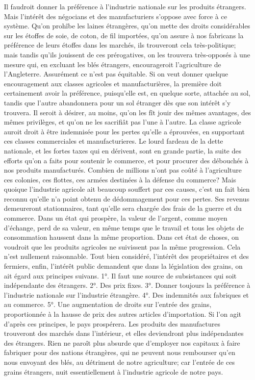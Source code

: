 \setcounter{page}{333} Il faudroit donner la préférence à l'industrie nationale sur les produits étrangers. Mais l'intérêt des négocians et des manufacturiers s'oppose avec force à ce système. Qu'on prohîbe les laines étrangères, qu'on mette des droits considérables sur les étoffes de soie, de coton, de fil importées, qu'on assure à nos fabricans la préférence de leurs étoffes dans les marchés, ils trouveront cela très-politique; mais tandis qu'ils jouissent de ces prérogatives, on les trouvera très-opposés à une mesure qui, en excluant les blés étrangers, encourageroit l'agriculture de l'Angleterre. Assurément ce n'est pas équitable. Si on veut donner quelque encouragement aux classes agricoles et manufacturières, la première doit certainement avoir la préférence, puisqu'elle est, en quelque sorte, attachée au sol, tandis que l'autre abandonnera pour un sol étranger dès que son intérêt s'y trouvera. Il seroit à désirer, au moins, qu'on les fît jouir des mêmes avantages, des mêmes privilèges, et qu'on ne les sacrifiât pas l'une à l'autre.
La classe agricole auroit droit à être indemnisée pour les pertes qu'elle a éprouvées, en supportant ces classes commerciales et manufacturieres. Le lourd fardeau de la dette\setcounter{page}{334} nationale, et les fortes taxes qui en dérivent, sont en grande partie, la suite des efforts qu'on a faits pour soutenir le commerce, et pour procurer des débouchés à nos produits manufacturés. Combien de millions n'ont pas coûté à l'agriculture ces colonies, ces flottes, ces armées destinées à la défense du commerce? Mais quoique l'industrie agricole ait beaucoup souffert par ces causes, c'est un fait bien reconnu qu'elle n'a point obtenu de dédommagement pour ces pertes. Ses revenus demeureront stationnaires, tant qu'elle sera chargée des frais de la guerre et du commerce.
Dans un état qui prospère, la valeur de l'argent, comme moyen d'échange, perd de sa valeur, en même temps que le travail et tous les objets de consommation haussent dans la même proportion. Dans cet état de choses, on voudroit que les produits agricoles ne suivissent pas la même progression. Cela n'est nullement raisonnable.
Tout bien considéré, l'intérêt des propriétaires et des fermiers, enfin, l'intérêt public demandent que dans la législation des grains, on ait égard aux principes suivans. 1°. Il faut une source de subsistances qui soit indépendante des étrangers. 2°. Des prix fixes.\setcounter{page}{335} 3°. Donner toujours la préférence à l'industrie nationale sur l'industrie étrangère. 4°. Des indemnités aux fabriques et au commerce. 5°. Une augmentation de droits sur l'entrée des grains, proportionnée à la hausse de prix des autres articles d'importation. Si l'on agit d'après ces principes, le pays prospérera. Les produits des manufactures trouveront des marchés dans l'intérieur, et elles deviendront plus indépendantes des étrangers. Rien ne paroît plus absurde que d'employer nos capitaux à faire fabriquer pour des nations étrangères, qui ne peuvent nous rembourser qu'en nous envoyant des blés, au détriment de notre agriculture; car l'entrée de ces grains étrangers, nuit essentiellement à l'industrie agricole de notre pays.
